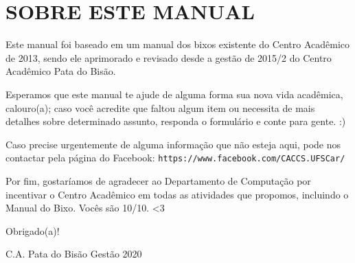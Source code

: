 \section{SOBRE ESTE MANUAL}
Este manual foi baseado em um manual dos bixos existente do Centro Acadêmico de 2013, sendo ele aprimorado e revisado desde a gestão de 2015/2 do Centro Acadêmico Pata do Bisão.

Esperamos que este manual te ajude de alguma forma sua nova vida acadêmica, calouro(a); caso você acredite que faltou algum item ou necessita de mais detalhes sobre determinado assunto, responda o formulário e conte para gente. :)

Caso precise urgentemente de alguma informação que não esteja aqui, pode nos contactar pela página do Facebook: \texttt{https://www.facebook.com/CACCS.UFSCar/}

Por fim, gostaríamos de agradecer ao Departamento de Computação por incentivar o Centro Acadêmico em todas as atividades que propomos, incluindo o Manual do Bixo. Vocês são 10/10. <3

\begin{flushright}
  Obrigado(a)!

  C.A. Pata do Bisão Gestão 2020
\end{flushright}
